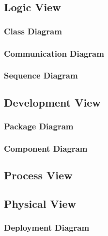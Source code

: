 \documentclass[12pt]{article}
\begin{document}
	\subsection {Logic View}
	
	

	\subsubsection{Class Diagram}



	\subsubsection{Communication Diagram}



	\subsubsection {Sequence Diagram}



	\subsection{Development View}



	\subsubsection{Package Diagram}



	\subsubsection{Component Diagram}



	\subsection{Process View}



	\subsection {Physical View}


	
	\subsubsection{Deployment Diagram}
\end{document}
